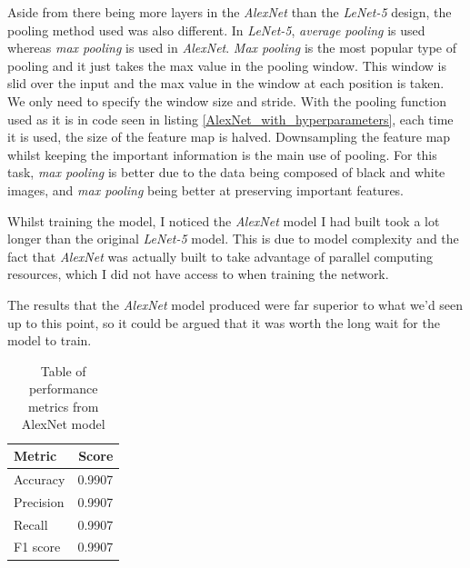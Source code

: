 \documentclass[11pt, letterpaper]{article}
\begin{document}
Aside from there being more layers in the \textit{AlexNet} than the \textit{LeNet-5} design, the pooling method used was also different. In \textit{LeNet-5}, \textit{average pooling} is used whereas \textit{max pooling} \cite{MATLABmaxPoolingLayer} is used in \textit{AlexNet}. \textit{Max pooling} is the most popular type of pooling and it just takes the max value in the pooling window. This window is slid over the input and the max value in the window at each position is taken. We only need to specify the window size and stride. With the pooling function used as it is in code seen in listing \ref{AlexNet_with_hyperparameters}, each time it is used, the size of the feature map is halved. Downsampling the feature map whilst keeping the important information is the main use of pooling. For this task, \textit{max pooling} is better due to the data being composed of black and white images, and \textit{max pooling} being better at preserving important features.

Whilst training the model, I noticed the \textit{AlexNet} model I had built took a lot longer than the original \textit{LeNet-5} model. This is due to model complexity and the fact that \textit{AlexNet} was actually built to take advantage of parallel computing resources, which I did not have access to when training the network.

The results that the \textit{AlexNet} model produced were far superior to what we'd seen up to this point, so it could be argued that it was worth the long wait for the model to train.

\begin{table}[ht]
  \begin{center}
    \caption{Table of performance metrics from AlexNet model}
    \label{tab:AlexNetPerformanceMetrics}
    \begin{tabular}{l|r} %
      \textbf{Metric} & \textbf{Score}\\
      \hline
      Accuracy & 0.9907\\
      Precision & 0.9907\\
      Recall & 0.9907\\
      F1 score & 0.9907\\
    \end{tabular}
  \end{center}
\end{table}
\end{document}
